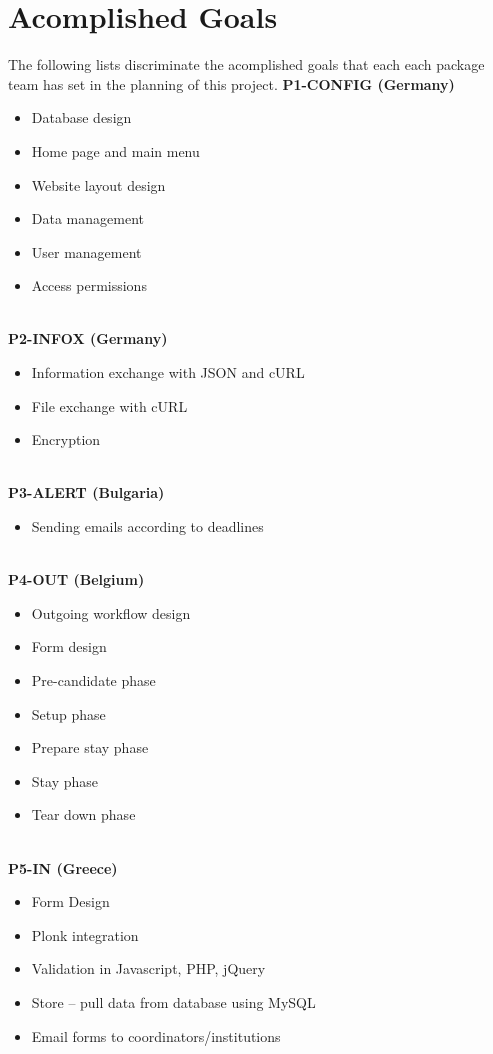 \section{Acomplished Goals}
The following lists discriminate the acomplished goals that each each package
team has set in the planning of this project.
\newline
\textbf{P1-CONFIG (Germany)}
\begin{itemize}
  \item Database design
  \item Home page and main menu
  \item Website layout design
  \item Data management
  \item User management
  \item Access permissions
\end{itemize}
\ \\
\textbf{P2-INFOX (Germany)}
\begin{itemize}
  \item Information exchange with JSON and cURL
  \item File exchange with cURL
  \item Encryption
\end{itemize}
\ \\
\textbf{P3-ALERT (Bulgaria)}
\begin{itemize}
  \item Sending emails according to deadlines
\end{itemize}
\ \\
\textbf{P4-OUT (Belgium)}
\begin{itemize}
  \item Outgoing workflow design
  \item Form design
  \item Pre-candidate phase
  \item Setup phase
  \item Prepare stay phase
  \item Stay phase
  \item Tear down phase
\end{itemize}
\ \\
\textbf{P5-IN (Greece)}
\begin{itemize}
  \item Form Design
  \item Plonk integration
  \item Validation in Javascript, PHP, jQuery
  \item Store – pull data from database using MySQL
  \item Email forms to coordinators/institutions
\end{itemize}
